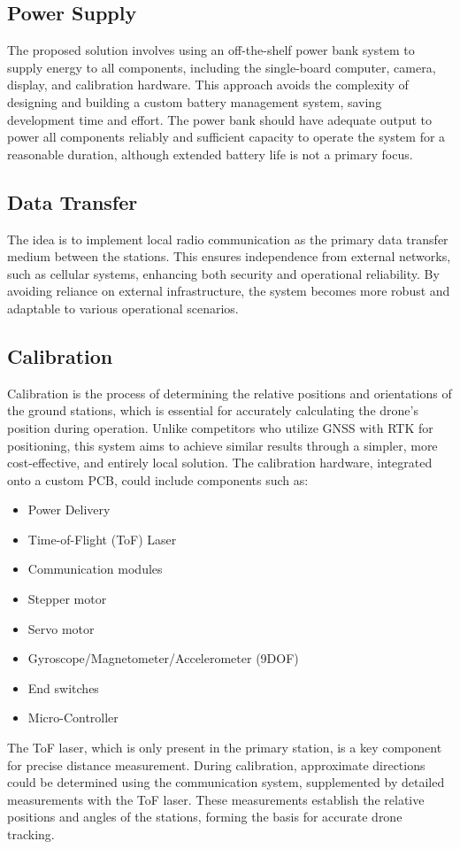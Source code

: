 \subsection{Power Supply}
The proposed solution involves using an off-the-shelf power bank system to supply energy to all components, including the single-board computer, camera, display, and calibration hardware. This approach avoids the complexity of designing and building a custom battery management system, saving development time and effort. The power bank should have adequate output to power all components reliably and sufficient capacity to operate the system for a reasonable duration, although extended battery life is not a primary focus.

\subsection{Data Transfer}
The idea is to implement local radio communication as the primary data transfer medium between the stations. This ensures independence from external networks, such as cellular systems, enhancing both security and operational reliability. By avoiding reliance on external infrastructure, the system becomes more robust and adaptable to various operational scenarios.

\subsection{Calibration}
Calibration is the process of determining the relative positions and orientations of the ground stations, which is essential for accurately calculating the drone's position during operation. Unlike competitors who utilize GNSS with RTK for positioning, this system aims to achieve similar results through a simpler, more cost-effective, and entirely local solution. The calibration hardware, integrated onto a custom PCB, could include components such as:
\begin{itemize}
	\item Power Delivery
	\item Time-of-Flight (ToF) Laser
	\item Communication modules
	\item Stepper motor
	\item Servo motor
	\item Gyroscope/Magnetometer/Accelerometer (9DOF)
	\item End switches
	\item Micro-Controller
\end{itemize}
The ToF laser, which is only present in the primary station, is a key component for precise distance measurement. During calibration, approximate directions could be determined using the communication system, supplemented by detailed measurements with the ToF laser. These measurements establish the relative positions and angles of the stations, forming the basis for accurate drone tracking.

